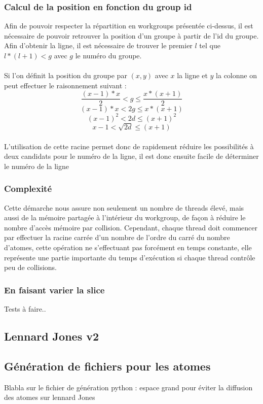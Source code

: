 \documentclass{article}
\begin{document}
\subsubsection{Calcul de la position en fonction du group id}
Afin de pouvoir respecter la répartition en workgroups présentée ci-dessus, il
est nécessaire de pouvoir retrouver la position d'un groupe à partir de l'id du
groupe. Afin d'obtenir la ligne, il est nécessaire de trouver le premier $l$ tel
que $l* (l+1) < g$ avec $g$ le numéro du groupe.
\paragraph{}
Si l'on définit la position du groupe par $(x,y)$ avec $x$ la ligne et $y$ la
colonne on peut effectuer le raisonnement suivant :
$$\frac{(x-1) * x}{2} < g \leq \frac{x * (x+1)}{2}$$
$$(x-1) * x < 2g \leq x * (x+1)$$
$$(x-1)^2 < 2d \leq (x+1)^2$$
$$x-1 < \sqrt{2d} \leq (x+1)$$
\paragraph{}
L'utilisation de cette racine permet donc de rapidement réduire les possibilités
à deux candidats pour le numéro de la ligne, il est donc ensuite facile de
déterminer le numéro de la ligne

\subsubsection{Complexité}
Cette démarche nous assure non seulement un nombre de threads élevé, mais aussi
de la mémoire partagée à l'intérieur du workgroup, de façon à réduire le nombre
d'accès mémoire par collision. Cependant, chaque thread doit commencer par
effectuer la racine carrée d'un nombre de l'ordre du carré du nombre d'atomes,
cette opération ne s'effectuant pas forcément en temps constante, elle
représente une partie importante du temps d'exécution si chaque thread contrôle
peu de collisions.
\subsubsection{En faisant varier la slice}
Tests à faire..

\subsection{Lennard Jones v2}


\subsection{Génération de fichiers pour les atomes}
Blabla sur le fichier de génération python : espace grand pour éviter la
diffusion des atomes sur lennard Jones
\end{document}
